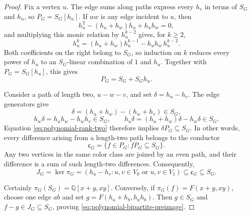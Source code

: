\documentclass[10pt,a4paper]{amsart}
\newcommand{\Q}{\mathbb{Q}}
\begin{document}
\begin{proof}
Fix a vertex $u$.  The edge sums along paths express every $h_v$ in terms of
$S_G$ and $h_u$, so $P_G=S_G[h_u]$.  If $uw$ is any edge incident to $u$,
then
\[
  h_u^2-(h_u+h_w)h_u+h_uh_w=0,
\]
and multiplying this monic relation by $h_u^{k-2}$ gives, for $k\geq2$,
\[
  h_u^k=(h_u+h_w)h_u^{k-1}-h_uh_w\,h_u^{k-2}.
\]
Both coefficients on the right belong to $S_G$, so induction on $k$ reduces
every power of $h_u$ to an $S_G$-linear combination of $1$ and $h_u$.
Together with $P_G=S_G[h_u]$, this gives
\begin{equation}\label{eq:polynomial-rank-two}
  P_G=S_G+S_Gh_u.
\end{equation}

Consider a path of length two, $u-w-v$, and set $\delta=h_u-h_v$.  The edge
generators give
\[
  \delta=(h_u+h_w)-(h_w+h_v)\in S_G,
\]
\[
  h_w\delta=h_uh_w-h_wh_v\in S_G,
  \qquad
  h_u\delta=(h_u+h_w)\delta-h_w\delta\in S_G.
\]
Equation \eqref{eq:polynomial-rank-two} therefore implies
$\delta P_G\subseteq S_G$.  In other words, every difference arising from a
length-two path belongs to the conductor
\[
  \mathfrak c_G=\{f\in P_G:fP_G\subseteq S_G\}.
\]
Any two vertices in the same color class are joined by an even path, and
their difference is a sum of such length-two differences.  Consequently,
\[
  J_G=\ker\pi_G
  =(h_u-h_v:u,v\in V_0\text{ or }u,v\in V_1)
  \subseteq\mathfrak c_G\subseteq S_G.
\]

Certainly $\pi_G(S_G)=\Q[x+y,xy]$.  Conversely, if
$\pi_G(f)=F(x+y,xy)$, choose one edge $ab$ and set
$g=F(h_a+h_b,h_ah_b)$.  Then $g\in S_G$ and
$f-g\in J_G\subseteq S_G$, proving
\eqref{eq:polynomial-bipartite-preimage}.
\end{proof}
\end{document}
